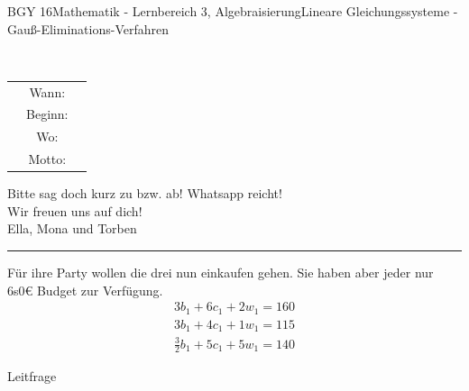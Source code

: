 \documentclass[oneside,openany,headings=optiontotoc,11pt,numbers=noenddot]{scrreprt}
\begin{document}
	\begin{worksheet}{BGY 16}{Mathematik - Lernbereich 3, Algebraisierung}{Lineare Gleichungssysteme - Gauß-Eliminations-Verfahren}
				
		\noindent
		\begin{framed}
			\\
			\begin{center}
				\begin{tabular}{lcr}
				& Wann: \color{codepurple}{12. Februar 2018} &\\
				& Beginn: \color{codepurple}{18:00 Uhr} & \\
				& Wo: \color{codepurple}{Haus der Vereine} & \\
				& Motto: \color{codepurple}{Be whatever or whoever you want to be!} &\\
				\end{tabular}
				\par
				\bigskip
				Bitte sag doch kurz zu bzw. ab! Whatsapp reicht!\\
				Wir freuen uns auf dich!\\
				\Large{Ella, Mona und Torben}
			\end{center}
			\hrule
			\par
			\bigskip
			\noindent
			Für ihre Party wollen die drei nun einkaufen gehen. Sie haben aber jeder nur 6s0\euro{} Budget zur Verfügung.\\
			\begin{align*}
				3b_{1} + 6c_{1} + 2w_{1} = 160\\
				3b_{1} + 4c_{1} + 1w_{1} = 115\\
				\frac{3}{2}b_{1} + 5c_{1} + 5w_{1} = 140
			\end{align*}
		\end{framed}

		\begin{framed}
		\color{codegray}\tiny{Leitfrage}
		\end{framed}
		

\end{worksheet}
\end{document}
